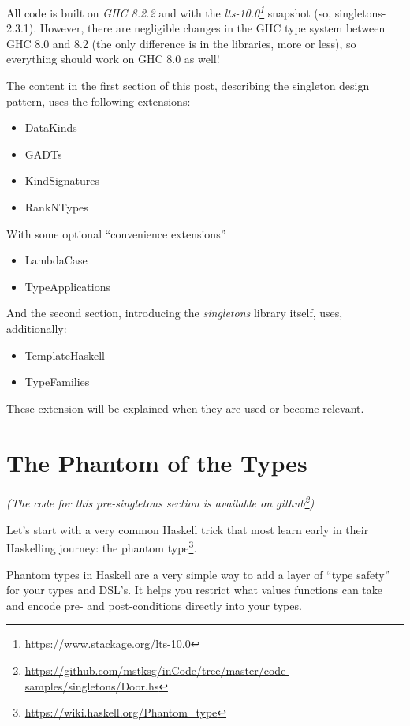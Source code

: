\documentclass[]{article}
\renewcommand{\href}[2]{#2\footnote{\url{#1}}}
\begin{document}
All code is built on \emph{GHC 8.2.2} and with the
\emph{\href{https://www.stackage.org/lts-10.0}{lts-10.0}} snapshot (so,
singletons-2.3.1). However, there are negligible changes in the GHC type system
between GHC 8.0 and 8.2 (the only difference is in the libraries, more or less),
so everything should work on GHC 8.0 as well!

The content in the first section of this post, describing the singleton design
pattern, uses the following extensions:

\begin{itemize}
\tightlist
\item
  DataKinds
\item
  GADTs
\item
  KindSignatures
\item
  RankNTypes
\end{itemize}

With some optional ``convenience extensions''

\begin{itemize}
\tightlist
\item
  LambdaCase
\item
  TypeApplications
\end{itemize}

And the second section, introducing the \emph{singletons} library itself, uses,
additionally:

\begin{itemize}
\tightlist
\item
  TemplateHaskell
\item
  TypeFamilies
\end{itemize}

These extension will be explained when they are used or become relevant.

\section{The Phantom of the Types}\label{the-phantom-of-the-types}

\emph{(The code for this pre-singletons section is available
\href{https://github.com/mstksg/inCode/tree/master/code-samples/singletons/Door.hs}{on
github})}

Let's start with a very common Haskell trick that most learn early in their
Haskelling journey: the \href{https://wiki.haskell.org/Phantom_type}{phantom
type}.

Phantom types in Haskell are a very simple way to add a layer of ``type safety''
for your types and DSL's. It helps you restrict what values functions can take
and encode pre- and post-conditions directly into your types.
\end{document}
